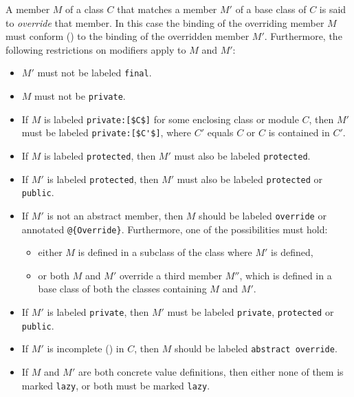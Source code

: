 A member $M$ of a class $C$ that matches a member $M'$ of a base class of $C$ is said to {\em override} that member. In this case the binding of the overriding member $M$ must conform () to the binding of the overridden member $M'$. Furthermore, the following restrictions on modifiers apply to $M$ and $M'$: 
\begin{itemize}
\item 
$M'$ must not be labeled \lstinline!final!. 

\item 
$M$ must not be \lstinline!private!. 

\item 
If $M$ is labeled \lstinline!private:[$C$]! for some enclosing class or module $C$, then $M'$ must be labeled \lstinline!private:[$C'$]!, where $C'$ equals $C$ or $C$ is contained in $C'$. %

\item 
If $M$ is labeled \lstinline!protected!, then $M'$ must also be labeled \lstinline!protected!. 

\item 
If $M'$ is labeled \lstinline!protected!, then $M'$ must also be labeled \lstinline!protected! or \lstinline!public!. 

\item
If $M'$ is not an abstract member, then $M$ should be labeled \lstinline!override! or annotated \lstinline!@{Override}!. Furthermore, one of the possibilities must hold:
\begin{itemize}
\item either $M$ is defined in a subclass of the class where $M'$ is defined,
\item or both $M$ and $M'$ override a third member $M''$, which is defined in a base class of both the classes containing $M$ and $M'$.
\end{itemize}

\item 
If $M'$ is labeled \lstinline!private!, then $M'$ must be labeled \lstinline!private!, \lstinline!protected! or \lstinline!public!. 

\item
If $M'$ is incomplete () in $C$, then $M$ should be labeled \lstinline!abstract override!. 

\item
If $M$ and $M'$ are both concrete value definitions, then either none of them is marked \lstinline!lazy!, or both must be marked \lstinline!lazy!. 
\end{itemize}

